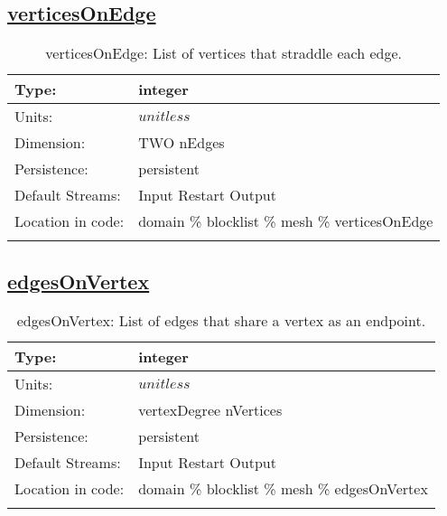 \subsection[verticesOnEdge]{\hyperref[sec:var_tab_mesh]{verticesOnEdge}}
\label{subsec:var_sec_mesh_verticesOnEdge}
\begin{center}
\begin{longtable}{| p{2.0in} | p{4.0in} |}
        \hline 
        Type: & integer \\
        \hline 
        Units: & $unitless$ \\
        \hline 
        Dimension: & TWO nEdges \\
        \hline 
        Persistence: & persistent \\
        \hline 
		 Default Streams: & Input Restart Output  \\
        \hline 
		 Location in code: & domain \% blocklist \% mesh \% verticesOnEdge \\
		 \hline 
    \caption{verticesOnEdge: List of vertices that straddle each edge.}
\end{longtable}
\end{center}
\subsection[edgesOnVertex]{\hyperref[sec:var_tab_mesh]{edgesOnVertex}}
\label{subsec:var_sec_mesh_edgesOnVertex}
\begin{center}
\begin{longtable}{| p{2.0in} | p{4.0in} |}
        \hline 
        Type: & integer \\
        \hline 
        Units: & $unitless$ \\
        \hline 
        Dimension: & vertexDegree nVertices \\
        \hline 
        Persistence: & persistent \\
        \hline 
		 Default Streams: & Input Restart Output  \\
        \hline 
		 Location in code: & domain \% blocklist \% mesh \% edgesOnVertex \\
		 \hline 
    \caption{edgesOnVertex: List of edges that share a vertex as an endpoint.}
\end{longtable}
\end{center}
